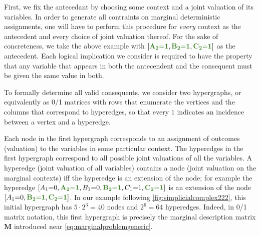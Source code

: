 \documentclass[aps,english,superscriptaddress,onecolumn,twoside,longbibliography,pra,floatfix,fleqn,nofootinbib]{revtex4-1}%
\newcommand*{\mgreen}[1]{{\color{OliveGreen}{\mathbf{#1}}}}
\newcommand*{\tred}[1]{{\color{carmine}{\textbf{#1}}}}
\theoremstyle{definition}
\newcommand{\cramp}[1]{\ensuremath{\mathord{#1}}}
\newcommand{\eql}{\cramp{=}}
\DeclarePairedDelimiter{\bracks}{\lbrack}{\rbrack}
\begin{document}
First, we fix the antecedant by choosing some context and a joint valuation of its variables. In order to generate all contraints on marginal deterministic assignments, one will have to perform this procedure for \emph{every} context as the antecedent and every choice of joint valuation thereof. For the sake of concreteness, we take the above example with $\bracks{\mgreen{A_2 \eql 1}, \mgreen{B_2 \eql 1}, \mgreen{C_2 \eql 1}}$ as the antecedent.  
Each logical implication we consider is required to have the property 
 that any variable that appears in both the antecendent and the consequent must be given the same value in both. 

To formally determine all valid consequents, we consider two hypergraphs, or equivalently as 0/1 matrices with rows that enumerate the vertices and the columns that correspond to hyperedges, so that every $1$ indicates an incidence between a vertex and a hyperedge. %

  Each node in the first hypergraph corresponds to an assignment of outcomes (valuation) to the variables in some particular context. 
The hyperedges in the first hypergraph correspond to all possible joint valuations of all the variables. A hyperedge (joint valuation of all variables) contains a node (joint valuation on the marginal contexts) iff the hyperedge is an extension of the node; for example the hyperedge $\bracks{A_1 \eql 0, \mgreen{A_2 \eql 1}, B_1 \eql 0, \mgreen{B_2 \eql 1}, C_1 \eql 1, \mgreen{C_2 \eql 1}}$ is an extension of the node $\bracks{A_1 \eql 0,  \mgreen{B_2 \eql 1}, \mgreen{C_2 \eql 1}}$. In our example following \cref{fig:simplicialcomplex222}, this initial hypergraph has $5\cdot 2^3 = 40$ nodes and $2^6 = 64$ hyperedges. Indeed, in 0/1 matrix notation, this first hypergraph is precisely the marginal description matrix $\bm{M}$ introduced near \cref{eq:marginalproblemgeneric}.
\end{document}
